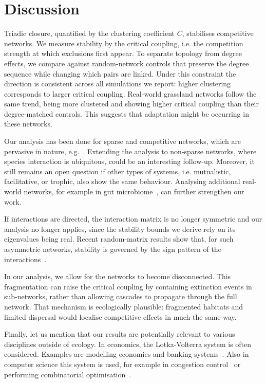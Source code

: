 \documentclass[a4paper,12pt]{article}
\begin{document}
\section{Discussion}
Triadic closure, quantified by the clustering coefficient $C$, stabilises competitive networks. 
We measure stability by the critical coupling, i.e. the competition strength at which exclusions first appear. 
To separate topology from degree effects, we compare against random-network controls that preserve the degree sequence while changing which pairs are linked. 
Under this constraint the direction is consistent across all simulations we report: higher clustering corresponds to larger critical coupling.
Real-world grassland networks follow the same trend, being more clustered and showing higher critical coupling than their degree-matched controls. 
This suggests that adaptation might be occurring in these networks.

Our analysis has been done for sparse and competitive networks, which are pervasive in nature, e.g.~\cite{connell1983}.
Extending the analysis to non-sparse networks, where species interaction is ubiquitous, could be an interesting follow-up.
Moreover, it still remains an open question if other types of systems, i.e. mutualistic, facilitative, or trophic, also show the same behaviour.
Analysing additional real-world networks, for example in gut microbiome~\cite{coyte2015, camacho2024}, can further strengthen our work.

If interactions are directed, the interaction matrix is no longer symmetric and our analysis no longer applies, since the stability bounds we derive rely on its eigenvalues being real. Recent random-matrix results show that, for such asymmetric networks, stability is governed by the sign pattern of the interactions~\cite{valigi2025eigenvalue}.

In our analysis, we allow for the networks to become disconnected.
This fragmentation can raise the critical coupling by containing extinction events in sub-networks, rather than allowing cascades to propagate through the full network. 
That mechanism is ecologically plausible: fragmented habitats and limited dispersal would localise competitive effects in much the same way.

Finally, let us mention that our results are potentially relevant to various disciplines outside of ecology. 
In economics, the Lotka-Volterra system is often considered. Examples are modelling economies and banking systems~\cite{comes2012banking, moran2019may}.
Also in computer science this system is used, for example in congestion control~\cite{pavlos2009, iguchi2005} or performing combinatorial optimisation~\cite{mooij2024findinglargeindependentsets}.
\end{document}
